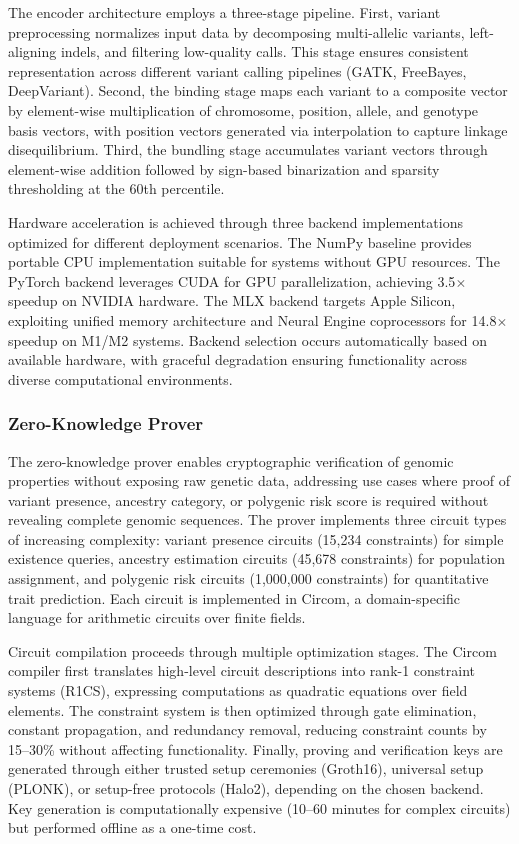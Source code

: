 \documentclass[11pt,letterpaper]{article}
\begin{document}
The encoder architecture employs a three-stage pipeline. First, variant preprocessing normalizes input data by decomposing multi-allelic variants, left-aligning indels, and filtering low-quality calls. This stage ensures consistent representation across different variant calling pipelines (GATK, FreeBayes, DeepVariant). Second, the binding stage maps each variant to a composite vector by element-wise multiplication of chromosome, position, allele, and genotype basis vectors, with position vectors generated via interpolation to capture linkage disequilibrium. Third, the bundling stage accumulates variant vectors through element-wise addition followed by sign-based binarization and sparsity thresholding at the 60th percentile.

Hardware acceleration is achieved through three backend implementations optimized for different deployment scenarios. The NumPy baseline provides portable CPU implementation suitable for systems without GPU resources. The PyTorch backend leverages CUDA for GPU parallelization, achieving 3.5$\times$ speedup on NVIDIA hardware. The MLX backend targets Apple Silicon, exploiting unified memory architecture and Neural Engine coprocessors for 14.8$\times$ speedup on M1/M2 systems. Backend selection occurs automatically based on available hardware, with graceful degradation ensuring functionality across diverse computational environments.

\subsubsection{Zero-Knowledge Prover}

The zero-knowledge prover enables cryptographic verification of genomic properties without exposing raw genetic data, addressing use cases where proof of variant presence, ancestry category, or polygenic risk score is required without revealing complete genomic sequences. The prover implements three circuit types of increasing complexity: variant presence circuits (15,234 constraints) for simple existence queries, ancestry estimation circuits (45,678 constraints) for population assignment, and polygenic risk circuits (1,000,000 constraints) for quantitative trait prediction. Each circuit is implemented in Circom, a domain-specific language for arithmetic circuits over finite fields.

Circuit compilation proceeds through multiple optimization stages. The Circom compiler first translates high-level circuit descriptions into rank-1 constraint systems (R1CS), expressing computations as quadratic equations over field elements. The constraint system is then optimized through gate elimination, constant propagation, and redundancy removal, reducing constraint counts by 15--30\% without affecting functionality. Finally, proving and verification keys are generated through either trusted setup ceremonies (Groth16), universal setup (PLONK), or setup-free protocols (Halo2), depending on the chosen backend. Key generation is computationally expensive (10--60 minutes for complex circuits) but performed offline as a one-time cost.
\end{document}
